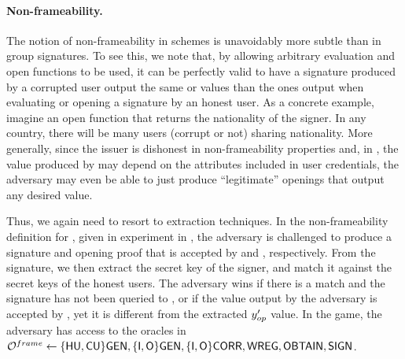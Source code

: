 \paragraph{Non-frameability.} %
The notion of non-frameability in \UAS schemes is unavoidably more subtle than
in group signatures. To see this, we note that, by allowing arbitrary
evaluation and open functions to be used, it can be perfectly valid to
have a signature produced by a corrupted user output the same \yeval or \yinsp
values than the ones output when evaluating or opening a signature by an honest
user. As a concrete example, imagine an open function that returns the
nationality of the signer. In any country, there will be many users (corrupt or
not) sharing nationality.
%
More generally, since the issuer is dishonest in non-frameability properties
and, in \UAS, the value produced by \Open may depend on the attributes
included in user credentials, the adversary may even be able to just produce
``legitimate'' openings that output any desired value.

Thus, we again need to resort to extraction techniques. In the non-frameability
definition for \UAS, given in experiment \ExpNonframe in
, the adversary is challenged to produce a signature
and opening proof that is accepted by \Verify and \Judge, respectively. From
the signature, we then extract the secret key of the signer, and match it
against the secret keys of the honest users. The adversary wins if there is a
match and the signature has not been queried to \SIGN, or if the value \yinsp
output by the adversary is accepted by \Judge, yet it is different from the
extracted $y_{op}'$ value. In the game, the
adversary has access to the oracles in $\mathcal{O}^{frame} \gets \lbrace\mathsf{HU},\mathsf{CU}\rbrace\mathsf{GEN},
\lbrace\mathsf{I},\mathsf{O}\rbrace\mathsf{GEN},\lbrace\mathsf{I},\mathsf{O}\rbrace\mathsf{CORR},\mathsf{WREG},\mathsf{OBTAIN},\mathsf{SIGN}$.

